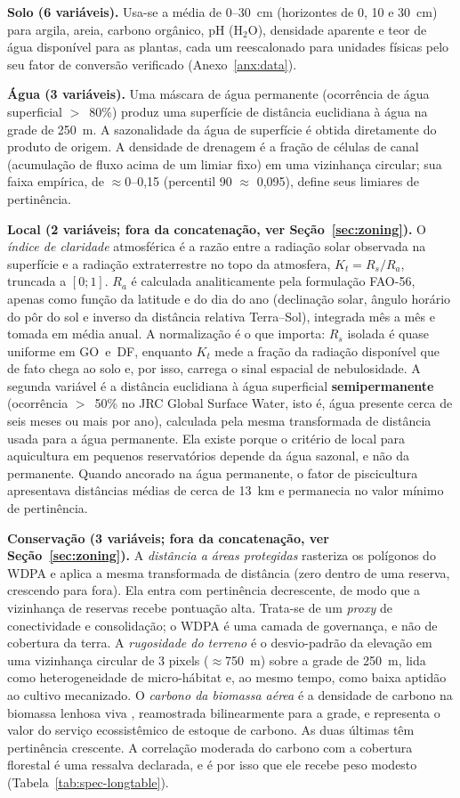\textbf{Solo (6 variáveis).} Usa-se a média de 0--30~cm (horizontes de 0, 10 e 30~cm) para argila,
areia, carbono orgânico, pH (H$_2$O), densidade aparente e teor de água disponível para as
plantas, cada um reescalonado para unidades físicas pelo seu fator de conversão verificado
(Anexo~\ref{anx:data}).

\textbf{Água (3 variáveis).} Uma máscara de água permanente (ocorrência de água superficial
$>$~80\%) produz uma superfície de distância euclidiana à água na grade de 250~m. A sazonalidade da
água de superfície é obtida diretamente do produto de origem. A densidade de drenagem é a fração de
células de canal (acumulação de fluxo acima de um limiar fixo) em uma vizinhança circular; sua faixa
empírica, de $\approx$0--0,15 (percentil 90 $\approx$ 0,095), define seus limiares de pertinência.

\textbf{Local (2 variáveis; fora da concatenação, ver Seção~\ref{sec:zoning}).} O \emph{índice de
claridade} atmosférica é a razão entre a radiação solar observada na superfície e a radiação
extraterrestre no topo da atmosfera, $K_t = R_s/R_a$, truncada a $[0;1]$. $R_a$ é calculada
analiticamente pela formulação FAO-56, apenas como função da latitude e do dia do ano (declinação
solar, ângulo horário do pôr do sol e inverso da distância relativa Terra--Sol), integrada mês a mês
e tomada em média anual. A normalização é o que importa: $R_s$ isolada é quase uniforme em GO~e~DF,
enquanto $K_t$ mede a fração da radiação disponível que de fato chega ao solo e, por isso, carrega o
sinal espacial de nebulosidade. A segunda variável é a distância euclidiana à água superficial
\textbf{semipermanente} (ocorrência $>$~50\% no JRC Global Surface Water, isto é, água presente cerca
de seis meses ou mais por ano), calculada pela mesma transformada de distância usada para a água
permanente. Ela existe porque o critério de local para aquicultura em pequenos reservatórios depende da
água sazonal, e não da permanente. Quando ancorado na água permanente, o fator de piscicultura
apresentava distâncias médias de cerca de 13~km e permanecia no valor mínimo de pertinência.

\textbf{Conservação (3 variáveis; fora da concatenação, ver Seção~\ref{sec:zoning}).} A
\emph{distância a áreas protegidas} rasteriza os polígonos do WDPA e aplica a mesma transformada de
distância (zero dentro de uma reserva, crescendo para fora). Ela entra com pertinência decrescente,
de modo que a vizinhança de reservas recebe pontuação alta. Trata-se de um \emph{proxy} de
conectividade e consolidação; o WDPA é uma camada de governança, e não de cobertura da terra. A
\emph{rugosidade do terreno} é o desvio-padrão da elevação em uma vizinhança circular de 3 pixels
($\approx$750~m) sobre a grade de 250~m, lida como heterogeneidade de micro-hábitat e, ao mesmo tempo,
como baixa aptidão ao cultivo mecanizado. O \emph{carbono da biomassa aérea} é a densidade de carbono
na biomassa lenhosa viva \citep{spawn_harmonized_2020}, reamostrada bilinearmente para a grade, e
representa o valor do serviço ecossistêmico de estoque de carbono. As duas últimas têm pertinência
crescente. A correlação moderada do carbono com a cobertura florestal é uma ressalva declarada, e é
por isso que ele recebe peso modesto (Tabela~\ref{tab:spec-longtable}).

